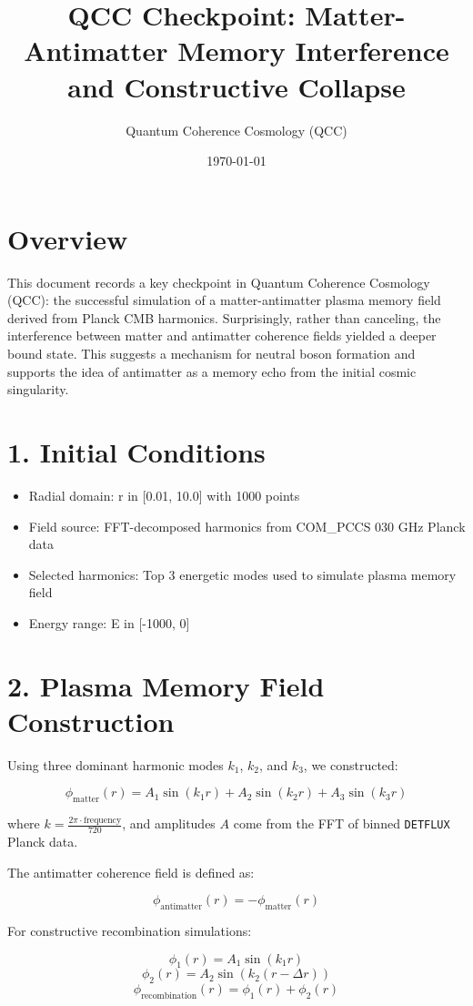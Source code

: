 \documentclass[12pt]{article}
\title{QCC Checkpoint: Matter-Antimatter Memory Interference and Constructive Collapse}
\author{Quantum Coherence Cosmology (QCC)}
\date{\today}
\begin{document}
\maketitle

\section*{Overview}
This document records a key checkpoint in Quantum Coherence Cosmology (QCC): the successful simulation of a matter-antimatter plasma memory field derived from Planck CMB harmonics. Surprisingly, rather than canceling, the interference between matter and antimatter coherence fields yielded a deeper bound state. This suggests a mechanism for neutral boson formation and supports the idea of antimatter as a memory echo from the initial cosmic singularity.

\section*{1. Initial Conditions}
\begin{itemize}
  \item Radial domain: r in [0.01, 10.0] with 1000 points
  \item Field source: FFT-decomposed harmonics from COM\_PCCS 030 GHz Planck data
  \item Selected harmonics: Top 3 energetic modes used to simulate plasma memory field
  \item Energy range: E in [-1000, 0]
\end{itemize}

\section*{2. Plasma Memory Field Construction}

Using three dominant harmonic modes $k_1$, $k_2$, and $k_3$, we constructed:

\[
	\phi_{\text{matter}}(r) = A_1 \sin(k_1 r) + A_2 \sin(k_2 r) + A_3 \sin(k_3 r)
\]

where $k = \frac{2\pi \cdot \text{frequency}}{720}$, and amplitudes $A$ come from the FFT of binned \texttt{DETFLUX} Planck data.

The antimatter coherence field is defined as:

\[
	\phi_{\text{antimatter}}(r) = -\phi_{\text{matter}}(r)
\]

For constructive recombination simulations:

\[
	\phi_1(r) = A_1 \sin(k_1 r)
\]
\[
	\phi_2(r) = A_2 \sin\left(k_2 (r - \Delta r)\right)
\]
\[
	\phi_{\text{recombination}}(r) = \phi_1(r) + \phi_2(r)
\]
\end{document}
